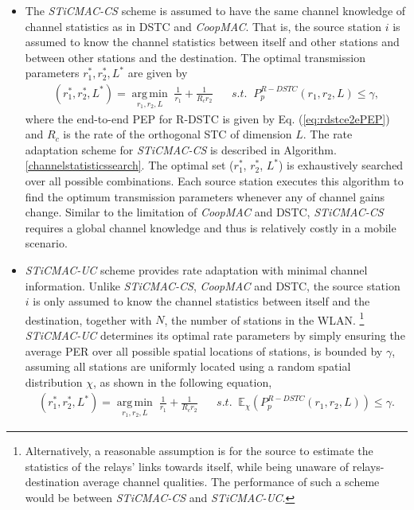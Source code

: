 \documentclass[peerreview,draftcls,onecolumn,12pt,a4paper]{IEEEtran}
\begin{document}
\begin{itemize}
    \item The  \emph{STiCMAC-CS} scheme is assumed to have the same channel knowledge of channel statistics as
   in DSTC and {\em CoopMAC}. That is, the source station $i$ is assumed to know the
    channel statistics between itself and other stations and
    between other stations and the destination. The optimal transmission
    parameters $r_{1}^{*}, r_{2}^{*}, L^{*}$ are given by
\begin{eqnarray}
(r_{1}^{*}, r_{2}^{*}, L^{*})=  \underset{r_{1}, r_{2}, L}{\operatorname{arg\,min}}  \; \frac{1}{r_{1}}+\frac{1}{R_{c} r_{2}} \;\;\;\;\;\;  s.t. \;\; {P_{p}^{R-DSTC}(r_1, r_2, L)}  \leq \gamma,
\label{rdstcrateadapt_channel_statistics}
\end{eqnarray}
where the end-to-end PEP for R-DSTC is given by Eq.
(\ref{eq:rdstce2ePEP}) and $R_c$ is the rate of the orthogonal STC
of dimension $L$. The rate adaptation scheme for \emph{STiCMAC-CS}
is described in Algorithm. \ref{channelstatisticssearch}. The
optimal set ($r_1^*$, $r_2^*$, $L^*$) is exhaustively searched
over all possible combinations. Each source station executes this
algorithm to find the optimum transmission parameters whenever any
of channel gains change. Similar to the limitation of {\em
CoopMAC} and DSTC, \emph{STiCMAC-CS} requires a global channel
knowledge and thus is relatively costly in a mobile scenario.

\item \emph{STiCMAC-UC} scheme provides rate adaptation with
minimal channel information. Unlike \emph{STiCMAC-CS}, {\em
CoopMAC} and DSTC, the source station $i$ is only assumed to know
the channel statistics between itself and the destination,
together with $N$, the number of stations in the WLAN.
\footnote{Alternatively, a reasonable assumption is for the source
to estimate  the statistics of the relays' links towards itself,
while being unaware of relays-destination average channel
qualities. The performance of such a scheme would be between {\em
STiCMAC-CS} and {\em STiCMAC-UC}.} \emph{STiCMAC-UC} determines
its optimal rate parameters by simply ensuring the average PER
over all possible spatial locations of stations, is bounded by
$\gamma$, assuming all stations are uniformly located using a
random spatial distribution $\chi$, as shown in the following
equation,
\begin{eqnarray}
(r_{1}^{*}, r_{2}^{*}, L^{*})=  \underset{r_{1}, r_{2}, L}{\operatorname{arg\,min}}  \; \frac{1}{r_{1}}+\frac{1}{R_{c} r_{2}} \;\;\;\;\;\; s.t. \;\; \mathbb{E}_{\chi}{\left (P_{p}^{R-DSTC}(r_1,
r_2,L)\right)} \leq \gamma. \label{rdstcrateadapt_user_count}
\end{eqnarray}


\end{itemize}
\end{document}
